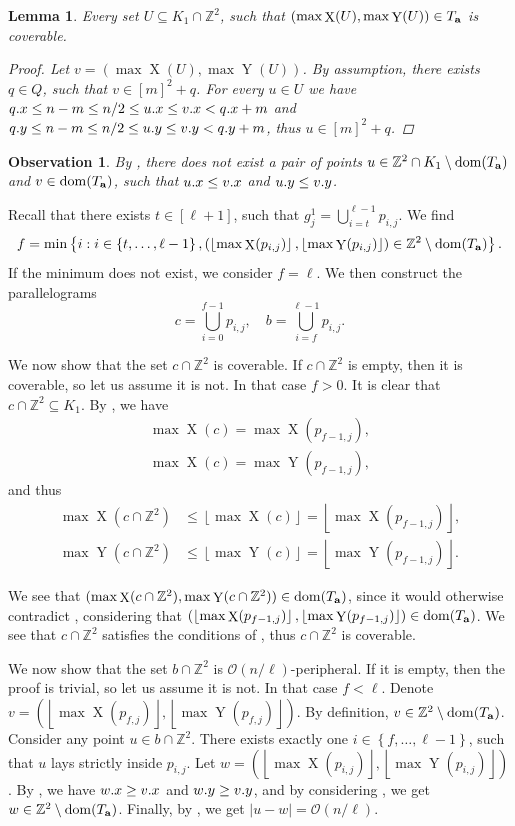 \documentclass[11pt, letterpaper]{article}
\theoremstyle{plain}
\newtheorem{lemma}{Lemma}
\newtheorem{observation}{Observation}
\theoremstyle{definition}
\theoremstyle{remark}
\newcommand{\Z}{\mathbb{Z}}
\renewcommand{\O}{\mathcal{O}}
\newcommand{\floor}[1]{\left\lfloor #1 \right\rfloor}
\newcommand{\set}[1]{\left\lbrace #1 \right\rbrace}
\newcommand{\eq}[1]{\begin{align*} #1 \end{align*}}
\DeclareMathOperator*{\X}{X}
\DeclareMathOperator*{\Y}{Y}
\begin{document}
\begin{lemma}\label{coverability_condition}
	Every set $U \subseteq K_1 \cap \Z^2$, such that $(\max \X(U), \max \Y(U)) \in \Ta$ is coverable.
	\begin{proof}
		Let $v = (\max \X(U), \max \Y(U))$.
		By assumption, there exists $q \in Q$, such that $v \in [m]^2 + q$.
		For every $u \in U$ we have
		$q.x \le n - m \le n / 2 \le u.x \le v.x < q.x + m$
		and $q.y \le n - m \le n / 2 \le u.y \le v.y < q.y + m$,
		thus $u \in [m]^2 + q$.
	\end{proof}
\end{lemma}

\begin{observation}\label{domination_lemma}
	By , there does not exist a pair of points $u \in \Z^2 \cap K_1 \setminus \d{\Ta}$ and $v \in \operatorname*{dom}(T_\mathbf{a})$, such that $u.x \le v.x$ and $u.y \le v.y$. 
\end{observation}

Recall that there exists $t \in [\ell + 1]$, such that
$ g^1_j = \bigcup_{i = t}^{\ell - 1} p_{i, j}.$
We find 
\[ f = \min\set{i : i \in \set{t, \dots, \ell - 1}, (\floor{\max \X(p_{i, j})}, \floor{\max \Y(p_{i, j})}) \in \Z^2 \setminus \d{\Ta}}.\]
If the minimum does not exist, we consider $f = \ell$.
We then construct the parallelograms
\[c = \bigcup_{i = 0}^{f - 1} p_{i, j}, \quad b = \bigcup_{i = f}^{\ell - 1} p_{i, j}.\]

We now show that the set $c \cap \Z^2$ is coverable.
If $c \cap \Z^2$ is empty, then it is coverable, so let us assume it is not.
In that case $f > 0$.
It is clear that $c \cap \Z^2 \subseteq K_1$.
By , we have 
\eq{
	\max \X(c) = \max \X(p_{f - 1, j}), \\
	\max \X(c) = \max \Y(p_{f - 1, j}),
}
and thus
\eq{
	\max \X(c \cap \Z^2) &\le \floor{\max \X(c)} = \floor{\max \X(p_{f - 1, j})}, \\
	\max \Y(c \cap \Z^2) &\le \floor{\max \Y(c)} = \floor{\max \Y(p_{f - 1, j})}.
}

We see that $(\max \X(c \cap \Z^2), \max \Y(c \cap \Z^2)) \in \d{\Ta}$, since it would otherwise contradict ,
considering that
$(\floor{\max \X(p_{f - 1, j})}, \floor{\max \Y(p_{f - 1, j})}) \in \d{\Ta}$.
We see that $c \cap \Z^2$ satisfies the conditions of , thus $c \cap \Z^2$ is coverable.

We now show that the set $b \cap \Z^2$ is $\O(n / \ell)$-peripheral.
If it is empty, then the proof is trivial, so let us assume it is not.
In that case $f < \ell$.
Denote $v = (\floor{\max \X(p_{f, j})}, \floor{\max \Y(p_{f, j})})$.
By definition, $v \in \Z^2 \setminus \d{\Ta}$.
Consider any point $u \in b \cap \Z^2$.
There exists exactly one $i \in \set{f, \dots, \ell - 1}$, such that $u$ lays strictly inside $p_{i, j}$.
Let $w = (\floor{\max \X(p_{i, j})}, \floor{\max \Y(p_{i, j})})$.
By , we have $w.x \ge v.x$ and $w.y \ge v.y$, and by considering ,
we get $w \in \Z^2 \setminus \d{\Ta}$.
Finally, by , we get $|u - w| = \O(n / \ell)$.
\end{document}
